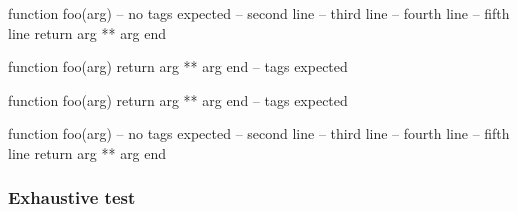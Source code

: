 \begin{CDRBlock}[
  pygments,
  lang=lua,
  numbers=none,
  debug,
  show tags=none,
  only top=false,
]
function foo(arg) -- no tags expected
  -- second line
  -- third line
  -- fourth line
  -- fifth line
  return arg ** arg
end
\end{CDRBlock}


\begin{CDRBlock}[
  fontfamily=menlo,
  fontsize=\large,
  pygments=true,
  lang=lua,
  numbers=left,
  debug=true,
  show tags,
  only top=false
]
function foo(arg) return arg ** arg end -- tags expected
\end{CDRBlock}
\begin{CDRBlock}[
  tags={whatever it isp,we are the champions},
  fontfamily=menlo,
  fontsize=\large,
  pygments=true,
  lang=lua,
  numbers=left,
  debug=true,
  show tags,
  only top
]
function foo(arg) return arg ** arg end -- tags expected
\end{CDRBlock}
\begin{CDRBlock}[
  pygments,
  lang=lua,
  numbers=none,
  debug,
  showspaces,
  show tags=none,
  only top=false,
]
function foo(arg) -- no tags expected
  -- second line
  -- third line
  -- fourth line
  -- fifth line
  return arg ** arg
end
\end{CDRBlock}

\egroup

\subsubsection{Exhaustive test}

\bgroup

